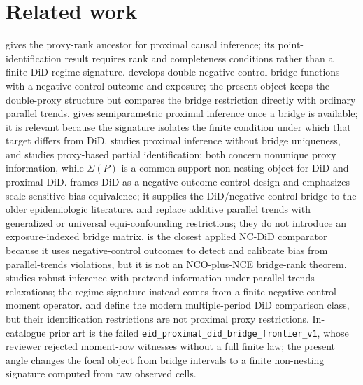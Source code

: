 \documentclass[11pt]{article}
\theoremstyle{definition}
\theoremstyle{plain}
\theoremstyle{remark}
\begin{document}
\section{Related work}
\citet{MiaoGengTchetgen2018} gives the proxy-rank ancestor for proximal causal inference; its point-identification result requires rank and completeness conditions rather than a finite DiD regime signature. \citet{MiaoShiLiTchetgen2024} develops double negative-control bridge functions with a negative-control outcome and exposure; the present object keeps the double-proxy structure but compares the bridge restriction directly with ordinary parallel trends. \citet{CuiPuShiMiaoTchetgen2024} gives semiparametric proximal inference once a bridge is available; it is relevant because the signature isolates the finite condition under which that target differs from DiD. \citet{ZhangLiMiaoTchetgen2023} studies proximal inference without bridge uniqueness, and \citet{GhassamiShpitserTchetgen2023} studies proxy-based partial identification; both concern nonunique proxy information, while \(\Sigma(P)\) is a common-support non-nesting object for DiD and proximal DiD. \citet{SoferRichardsonColicinoSchwartzTchetgen2016} frames DiD as a negative-outcome-control design and emphasizes scale-sensitive bias equivalence; it supplies the DiD/negative-control bridge to the older epidemiologic literature. \citet{RichardsonYeTchetgen2023} and \citet{TchetgenParkRichardson2024} replace additive parallel trends with generalized or universal equi-confounding restrictions; they do not introduce an exposure-indexed bridge matrix. \citet{ZhangZhangWangEtAl2025} is the closest applied NC-DiD comparator because it uses negative-control outcomes to detect and calibrate bias from parallel-trends violations, but it is not an NCO-plus-NCE bridge-rank theorem. \citet{RambachanRoth2023} studies robust inference with pretrend information under parallel-trends relaxations; the regime signature instead comes from a finite negative-control moment operator. \citet{CallawaySantAnna2021} and \citet{SunAbraham2021} define the modern multiple-period DiD comparison class, but their identification restrictions are not proximal proxy restrictions. In-catalogue prior art is the failed \texttt{eid\_proximal\_did\_bridge\_frontier\_v1}, whose reviewer rejected moment-row witnesses without a full finite law; the present angle changes the focal object from bridge intervals to a finite non-nesting signature computed from raw observed cells.
\end{document}
